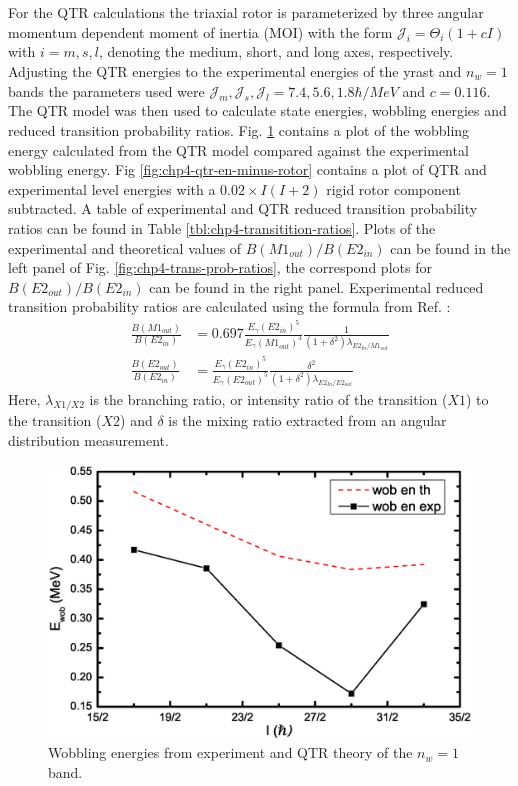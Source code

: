 For the QTR calculations the triaxial rotor is parameterized by three angular momentum dependent moment of inertia (MOI) with the form $\mathcal{J}_i=\Theta_i(1+cI)$ with $i=m,s,l$, denoting the medium, short, and long axes, respectively. Adjusting the QTR energies to the experimental energies of the yrast and $n_w=1$ bands the parameters used were $\mathcal{J}_m,\mathcal{J}_s,\mathcal{J}_l = 7.4, 5.6, 1.8 \hbar{}/MeV$ and $c=0.116$. The QTR model was then used to calculate state energies, wobbling energies and reduced transition probability ratios. Fig. \ref{fig:chp4-wobb-en} contains a plot of the wobbling energy calculated from the QTR model compared against the experimental wobbling energy. Fig \ref{fig:chp4-qtr-en-minus-rotor} contains a plot of QTR and experimental level energies with a $0.02\times{}I(I+2)$ rigid rotor component subtracted. A table of experimental and QTR reduced transition probability ratios can be found in Table \ref{tbl:chp4-transitition-ratios}. Plots of the experimental and theoretical values of $B(M1_{out})/B(E2_{in})$ can be found in the left panel of Fig. \ref{fig:chp4-trans-prob-ratios}, the correspond plots for $B(E2_{out})/B(E2_{in})$ can be found in the right panel. Experimental reduced transition probability ratios are calculated using the formula from Ref. \cite{exoticNuclearExcitations}:
\begin{align}
\label{eqn:chp4-red-trans-prob-ratios}
\frac{B(M1_{out})}{B(E2_{in})} &= 0.697 \frac{E_{\gamma}(E2_{in})^5}{E_{\gamma}(M1_{out})^3}\frac{1}{(1+\delta^2)\lambda{}_{E2_{In}/M1_{out}}}\\
\frac{B(E2_{out})}{B(E2_{in})} &= \frac{E_{\gamma}(E2_{in})^5}{E_{\gamma}(E2_{out})^5}\frac{\delta^2}{(1+\delta^2)\lambda{}_{E2_{In}/E2_{out}}}
\end{align}
Here, $\lambda{}_{X1/X2}$ is the branching ratio, or intensity ratio of the transition ($X1$) to the transition ($X2$) and $\delta$ is the mixing ratio extracted from an angular distribution measurement.

\begin{figure}[t!]
\centerline{\includegraphics[width=\textwidth]{./img/c4/wob_en.eps}}
	\caption{Wobbling energies from experiment and QTR theory of the $n_w=1$ band.\label{fig:chp4-wobb-en}}
\end{figure}

